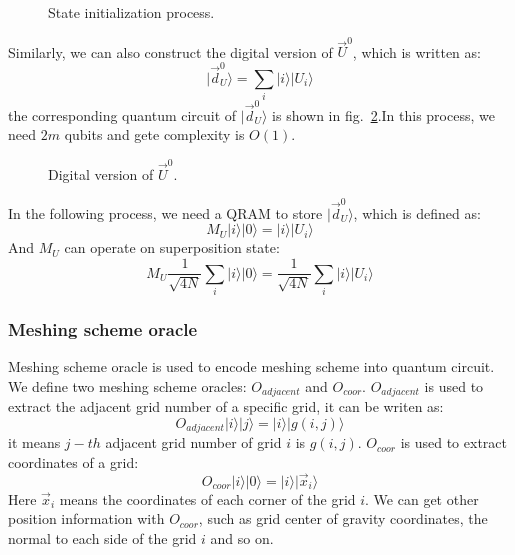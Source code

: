 \documentclass[%
 reprint,
 amsmath,amssymb,
pra,
]{revtex4-1}
\begin{document}
\begin{figure}[htbp]
    \caption{State initialization process.  }
    \label{state_initialization}
\end{figure}
Similarly, we can also construct the digital version of $\vec{U}^0$, which is written as:
$$
|\vec{d}_U^0\rangle=\sum_i{|i\rangle|U_i\rangle}
$$
the corresponding quantum circuit of $|\vec{d}_U^0\rangle$ is shown in fig.~\ref{digit_state_initialization}.In this process, we need $2m$ qubits and gete complexity is $O(1)$.

\begin{figure}[htbp]
    \caption{Digital version of $\vec{U}^0$. }
    \label{digit_state_initialization}
\end{figure}

In the following process, we need a QRAM to store $|\vec{d}_U^0\rangle$, which is defined as:
$$
M_U|i\rangle|0\rangle=|i\rangle|U_i\rangle
$$
And $M_U$ can operate on superposition state:
$$
M_U\frac{1}{\sqrt{4N}}\sum_i{|i\rangle|0\rangle}=\frac{1}{\sqrt{4N}}\sum_i{|i\rangle|U_i\rangle}
$$

\subsubsection{Meshing scheme oracle}

Meshing scheme oracle is used to encode meshing scheme into quantum circuit. We define two meshing scheme oracles: $O_{adjacent}$ and $O_{coor}$. $O_{adjacent}$ is used to extract the adjacent grid number of a specific grid, it can be writen as:
$$
O_{adjacent}|i\rangle|j\rangle=|i\rangle|g(i,j)\rangle
$$
it means $j-th$ adjacent grid number of grid $i$ is $g(i,j)$. $O_{coor}$ is used to extract coordinates of a grid:
$$
O_{coor}|i\rangle|0\rangle=|i\rangle|\vec{x}_i\rangle
$$
Here $\vec{x}_i$ means the coordinates of each corner of the grid $i$. We can get other position information with $O_{coor}$, such as grid center of gravity coordinates, the normal to each side of the grid $i$ and so on.
\end{document}
